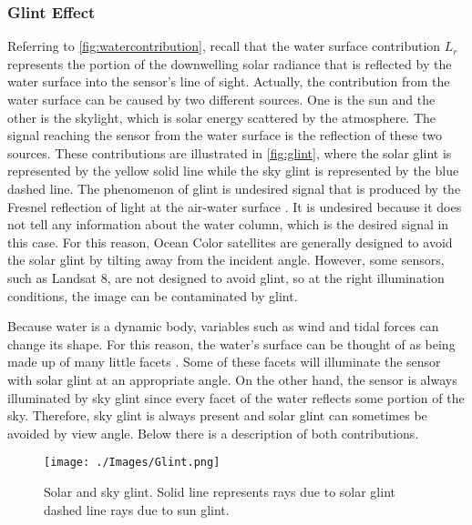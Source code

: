 \subsubsection{Glint Effect}
Referring to \autoref{fig:watercontribution}, recall that the water surface contribution $L_r$ represents the portion of the downwelling solar radiance that is reflected by the water surface into the sensor's line of sight. Actually, the contribution from the water surface can be caused by two different sources. One is the sun and the other is the skylight, which is solar energy scattered by the atmosphere. The signal reaching the sensor from the water surface is the reflection of these two sources. These contributions are illustrated in \autoref{fig:glint}, where the solar glint is represented by the yellow solid line while the sky glint is represented by the blue dashed line. The phenomenon of glint is undesired signal that is produced by the Fresnel reflection of light at the air-water surface \citep{GeraceThesis}. It is undesired because it does not tell any information about the water column, which is the desired signal in this case. For this reason, Ocean Color satellites are generally designed to avoid the solar glint by tilting away from the incident angle. However, some sensors, such as Landsat 8, are not designed to avoid glint, so at the right illumination conditions, the image can be contaminated by glint.

Because water is a dynamic body, variables such as wind and tidal forces can change its shape. For this reason, the water's surface can be thought of as being made up of many little facets \citep{GeraceThesis}. Some of these facets will illuminate the sensor with solar glint at an appropriate angle. On the other hand, the sensor is always illuminated by sky glint since every facet of the water reflects some portion of the sky. Therefore, sky glint is always present and solar glint can sometimes be avoided by view angle. Below there is a description of both contributions. 

\begin{figure}[htb]
\centering
\texttt{[image: ./Images/Glint.png]}
\caption{Solar and sky glint. Solid line represents rays due to solar glint dashed line rays due to sun glint.} 
\label{fig:glint}
\end{figure}
